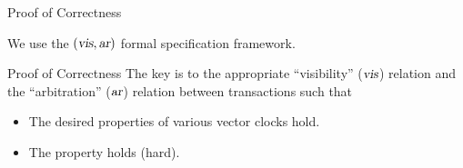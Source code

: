 
\begin{frame}{Proof of Correctness}
  \begin{center}
    We use the $(\textsl{vis}, \textsl{ar})$ formal specification framework.

    \vspace{0.60cm}
  \end{center}
\end{frame}

\begin{frame}{Proof of Correctness}
  The key is to  the appropriate ``visibility'' ($\textsl{vis}$) relation
  and the ``arbitration'' ($\textsl{ar}$) relation between transactions such that \\[10pt]

  \begin{itemize}
    \setlength{\itemsep}{8pt}
    \item The desired properties of various vector clocks hold.
    \item The  property holds (\textup{hard}).
  \end{itemize}
\end{frame}
